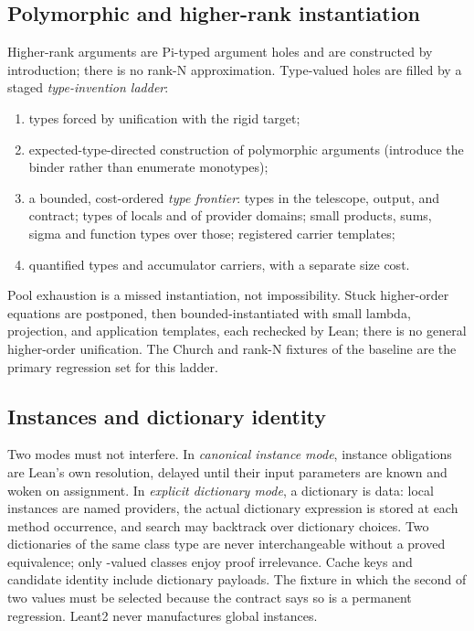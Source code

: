 \subsection{Polymorphic and higher-rank instantiation}\label{sec:polymorphism}

Higher-rank arguments are Pi-typed argument holes and are constructed by introduction; there is no rank-N approximation. Type-valued holes are filled by a staged \emph{type-invention ladder}:
\begin{enumerate}
\item types forced by unification with the rigid target;
\item expected-type-directed construction of polymorphic arguments (introduce the binder rather than enumerate monotypes);
\item a bounded, cost-ordered \emph{type frontier}: types in the telescope, output, and contract; types of locals and of provider domains; small products, sums, sigma and function types over those; registered carrier templates;
\item quantified types and accumulator carriers, with a separate size cost.
\end{enumerate}
Pool exhaustion is a missed instantiation, not impossibility. Stuck higher-order equations are postponed, then bounded-instantiated with small lambda, projection, and application templates, each rechecked by Lean; there is no general higher-order unification. The Church and rank-N fixtures of the baseline are the primary regression set for this ladder.

\subsection{Instances and dictionary identity}\label{sec:instances}

Two modes must not interfere. In \emph{canonical instance mode}, instance obligations are Lean's own resolution, delayed until their input parameters are known and woken on assignment. In \emph{explicit dictionary mode}, a dictionary is data: local instances are named providers, the actual dictionary expression is stored at each method occurrence, and search may backtrack over dictionary choices. Two dictionaries of the same class type are never interchangeable without a proved equivalence; only -valued classes enjoy proof irrelevance. Cache keys and candidate identity include dictionary payloads. The fixture in which the second of two  values must be selected because the contract says so is a permanent regression. Leant2 never manufactures global instances.

